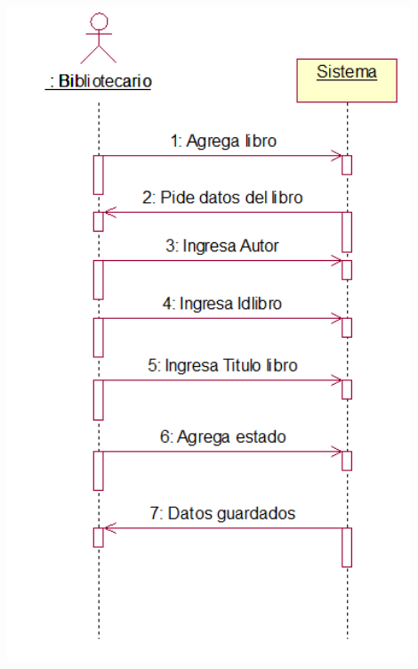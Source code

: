 \begin{enumerate}[1.]
	\begin{center}
	\includegraphics[width=12cm]{./Imagenes/img4} 
	\end{center}


\end{enumerate}
